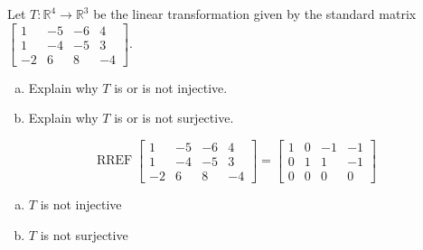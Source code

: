 
\begin{exerciseStatement}
 Let \(T:\mathbb{R}^ 4  \to \mathbb{R}^ 3 \) be the linear transformation given by the standard matrix \( \left[\begin{array}{cccc}
1 & -5 & -6 & 4 \\
1 & -4 & -5 & 3 \\
-2 & 6 & 8 & -4
\end{array}\right] .\)
\begin{enumerate}[(a)]
\item Explain why \(T\) is or is not injective.
\item Explain why \(T\) is or is not surjective.
\end{enumerate}
    
\end{exerciseStatement}
    
\begin{exerciseAnswer} 


\[\operatorname{RREF} \left[\begin{array}{cccc}
1 & -5 & -6 & 4 \\
1 & -4 & -5 & 3 \\
-2 & 6 & 8 & -4
\end{array}\right] = \left[\begin{array}{cccc}
1 & 0 & -1 & -1 \\
0 & 1 & 1 & -1 \\
0 & 0 & 0 & 0
\end{array}\right] \]


\begin{enumerate}[(a)]
\item \(T\) is not injective
\item \(T\) is not surjective
\end{enumerate}
    
\end{exerciseAnswer}
    
